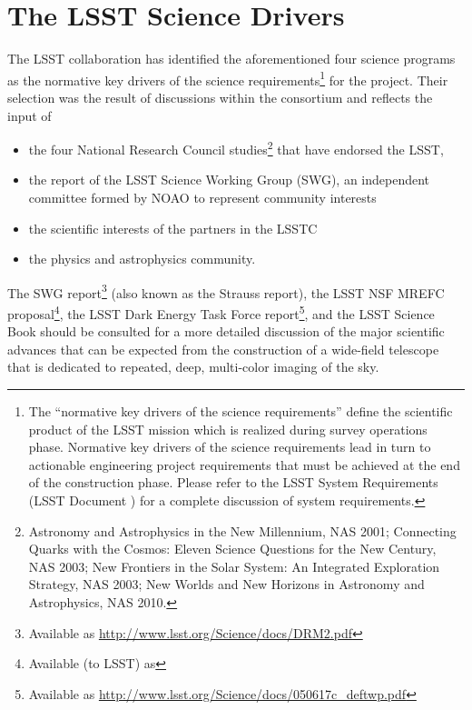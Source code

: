 \section{The LSST Science Drivers }
\label{scidriv}

The LSST collaboration has identified the aforementioned four science
programs as the normative key drivers of the science
requirements\footnote{The ``normative key drivers of the science requirements'' define
the scientific product of the LSST mission which is realized during survey operations phase.
Normative key drivers of the science requirements lead in turn to actionable engineering project
requirements that must be achieved at the end of the construction phase.  Please refer to the
LSST System Requirements (LSST Document ) for a complete discussion of system requirements.}
for the project. Their selection was the result of discussions within the
consortium and reflects the input of
\begin{itemize}
\item the four National Research Council studies\footnote{
  Astronomy and Astrophysics in the New Millennium, NAS 2001;
  Connecting Quarks with the Cosmos: Eleven Science Questions for the New Century, NAS 2003;
  New Frontiers in the Solar System: An Integrated Exploration Strategy, NAS 2003;
  New Worlds and New Horizons in Astronomy and Astrophysics, NAS 2010.
} that have endorsed the LSST,
\item the report of the LSST Science Working Group (SWG), an independent
      committee formed by NOAO to represent community interests
\item the scientific interests of the partners in the LSSTC
\item the physics and astrophysics community.
\end{itemize}

The SWG report\footnote{Available as
\url{http://www.lsst.org/Science/docs/DRM2.pdf}} (also known as the Strauss
report), the LSST NSF MREFC proposal\footnote{Available (to LSST) as
},
the LSST Dark Energy Task Force report\footnote{Available as
\url{http://www.lsst.org/Science/docs/050617c_deftwp.pdf}}, and the LSST
Science Book should be
consulted for a more detailed discussion of the major scientific advances
that can be expected from the construction of a wide-field telescope that
is dedicated to repeated, deep, multi-color imaging of the sky.

